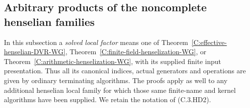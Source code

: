 \subsection{Arbitrary products of the noncomplete henselian families}
\label{C:henselian-products-subsection}

In this subsection a \emph{solved local factor} means one of
Theorem~\ref{C:effective-henselian-DVR-WG},
Theorem~\ref{C:finite-field-henselization-WG}, or
Theorem~\ref{C:arithmetic-henselization-WG}, with its supplied
finite input presentation.  Thus all its canonical indices,
actual generators and operations are given by ordinary
terminating algorithms.  The proofs apply as well to any
additional henselian local family for which those same
finite-name and kernel algorithms have been supplied.
We retain the notation of (C.3.HD2).

